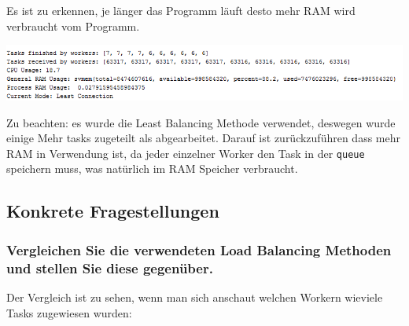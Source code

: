 Es ist zu erkennen, je länger das Programm läuft desto mehr RAM wird verbraucht vom Programm.

\begin{minipage}{\linewidth}
	\centering
	\includegraphics[width=1\linewidth]{images/belastung2}
\end{minipage}

Zu beachten: es wurde die Least Balancing Methode verwendet, deswegen wurde einige Mehr tasks zugeteilt als abgearbeitet. Darauf ist zurückzuführen dass mehr RAM in Verwendung ist, da jeder einzelner Worker den Task in der \verb|queue| speichern muss, was natürlich im RAM Speicher verbraucht. 

\subsection{Konkrete Fragestellungen}
\subsubsection{Vergleichen Sie die verwendeten Load Balancing Methoden und stellen Sie diese gegenüber.}
Der Vergleich ist zu sehen, wenn man sich anschaut welchen Workern wieviele Tasks zugewiesen wurden:


